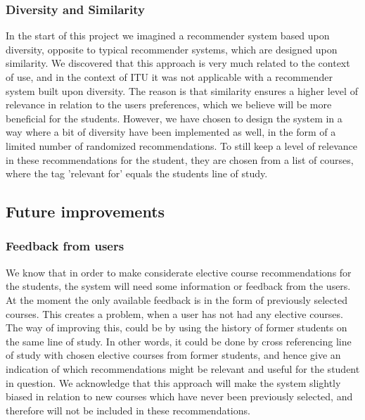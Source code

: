 \subsubsection{Diversity and Similarity}
In the start of this project we imagined a recommender system based upon diversity, opposite to typical recommender systems, which are designed upon similarity.\newline
We discovered that this approach is very much related to the context of use, and in the context of ITU it was not applicable with a recommender system built upon diversity. The reason is that similarity ensures a higher level of relevance in relation to the users preferences, which we believe will be more beneficial for the students. However, we have chosen to design the system in a way where a bit of diversity have been implemented as well, in the form of a limited number of randomized recommendations. To still keep a level of relevance in these recommendations for the student, they are chosen from a list of courses, where the tag 'relevant for' equals the students line of study.

\subsection{Future improvements}
\subsubsection*{Feedback from users}
We know that in order to make considerate elective course recommendations for the students, the system will need some information or feedback from the users. At the moment the only available feedback is in the form of previously selected courses. This creates a problem, when a user has not had any elective courses.\newline
The way of improving this, could be by using the history of former students on the same line of study. In other words, it could be done by cross referencing line of study with chosen elective courses from former students, and hence give an indication of which recommendations might be relevant and useful for the student in question.\newline
We acknowledge that this approach will make the system slightly biased in relation to new courses which have never been previously selected, and therefore will not be included in these recommendations.

